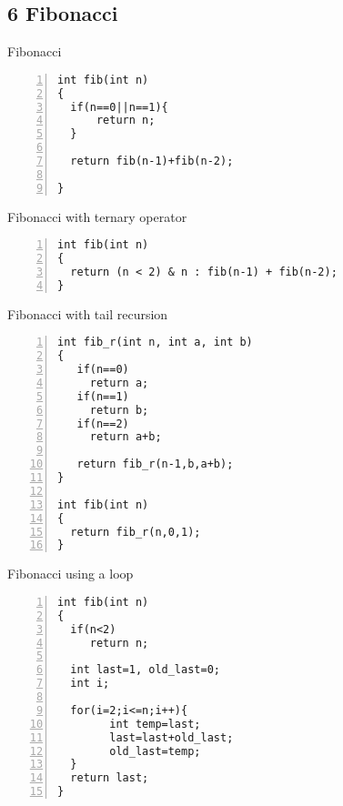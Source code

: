 \documentclass{beamer}
\begin{document}
\subsection*{6 Fibonacci}
\begin{frame}[fragile]{Fibonacci}
\begin{lstlisting}[numbers=left]
int fib(int n)
{
  if(n==0||n==1){
      return n;
  }

  return fib(n-1)+fib(n-2);

}
\end{lstlisting}
\end{frame}

\begin{frame}[fragile]{Fibonacci with ternary operator}
\begin{lstlisting}[numbers=left]
int fib(int n)
{
  return (n < 2) & n : fib(n-1) + fib(n-2); 
}
\end{lstlisting}
\end{frame}



\begin{frame}[fragile]{Fibonacci with tail recursion}
\begin{lstlisting}[numbers=left]
int fib_r(int n, int a, int b)
{
   if(n==0)
     return a;
   if(n==1)
     return b;
   if(n==2)
     return a+b;

   return fib_r(n-1,b,a+b);
}

int fib(int n)
{
  return fib_r(n,0,1);
}
\end{lstlisting}
\end{frame}



\begin{frame}[fragile]{Fibonacci using a loop}
\begin{lstlisting}[numbers=left]
int fib(int n)
{
  if(n<2)
     return n;
  
  int last=1, old_last=0;
  int i;

  for(i=2;i<=n;i++){
        int temp=last;
        last=last+old_last;
        old_last=temp;
  }
  return last;
}
\end{lstlisting}
\end{frame}
\end{document}
